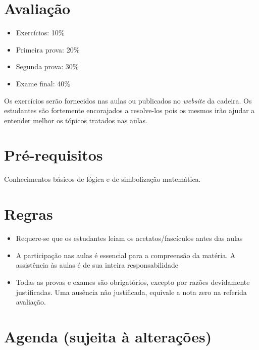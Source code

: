 \section*{Avaliação}%
\begin{itemize}
  \item Exercícios: 10\%
  \item Primeira prova: 20\%
  \item Segunda prova: 30\%
  \item Exame final: 40\%
\end{itemize}

Os exercícios serão fornecidos nas aulas ou publicados no \emph{website} da cadeira. Os estudantes são fortemente encorajados
a resolve-los pois os mesmos irão ajudar a entender melhor os tópicos tratados nas aulas.
%
\section*{Pré-requisitos}

Conhecimentos básicos de lógica e de simbolização matemática.

\section*{Regras}

\begin{itemize}
  \item Requere-se que os estudantes leiam os acetatos/fascículos antes das aulas
  \item {A participação nas aulas é essencial para a compreensão da matéria. A assistência às aulas é de sua inteira
  responsabilidade}
  \item {Todas as provas e exames são obrigatórios, excepto por razões devidamente justificadas. Uma ausência não justificada, 
  equivale a nota zero na referida avaliação.}
\end{itemize}

\section*{Agenda (sujeita à alterações)}

